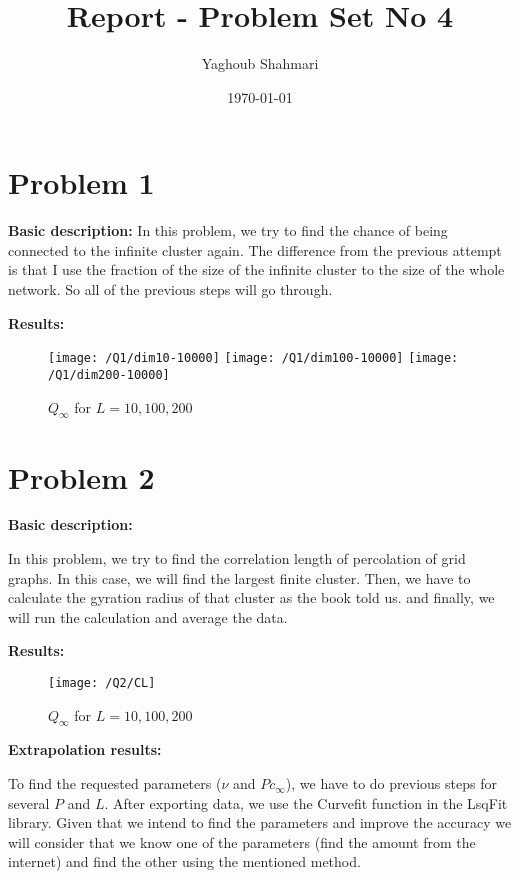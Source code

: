 \documentclass{article}
\author{Yaghoub Shahmari}
\title{Report - Problem Set No 4}
\date{\today}
\begin{document}
    \maketitle
    \section*{Problem 1}
    \textbf{Basic description:}
    In this problem, we try to find the chance of being connected to the infinite cluster again.
    The difference from the previous attempt is that I use the fraction of the size of the infinite
    cluster to the size of the whole network. So all of the previous steps will go through.

    \textbf{Results:}

    \begin{figure}[!htb]
        \centering
        \texttt{[image: /Q1/dim10-10000]}
        \label{fig:1.1}
        \texttt{[image: /Q1/dim100-10000]}
        \label{fig:1.2}
        \texttt{[image: /Q1/dim200-10000]}
        \label{fig:1.3}
        \caption{$Q_{\infty}$ for $L=10, 100, 200$}
    \end{figure}

    \pagebreak

    \section*{Problem 2}
    \textbf{Basic description:}

    In this problem, we try to find the correlation length of percolation of grid graphs.
    In this case, we will find the largest finite cluster.
    Then, we have to calculate the gyration radius of that cluster as the book told us.
    and finally, we will run the calculation and average the data.

    \textbf{Results:}

    \begin{figure}[!htb]
        \centering
        \texttt{[image: /Q2/CL]}
        \label{fig:2.1}
        \caption{$Q_{\infty}$ for $L=10, 100, 200$}
    \end{figure}

    \textbf{Extrapolation results:}

    To find the requested parameters ($\nu$ and $Pc_{\infty}$),
    we have to do previous steps for several $P$ and $L$.
    After exporting data, we use the Curvefit function in the LsqFit library.
    Given that we intend to find the parameters and improve the
    accuracy we will consider that we know one of the parameters (find the amount from the internet)
    and find the other using the mentioned method.
\end{document}
